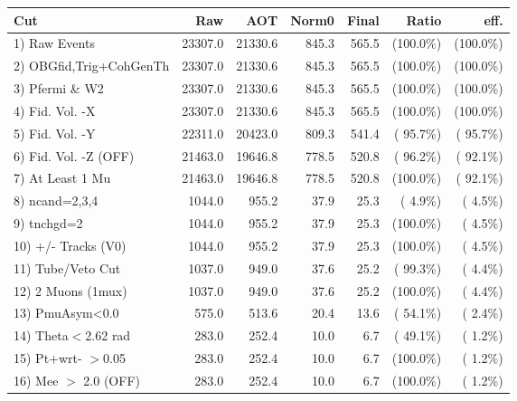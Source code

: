  \begin{table}[h!]\centering
 \begin{tabular}{||l||r|r|r|r|r|r||}
 \hline
 \hline
 Cut & Raw & AOT & Norm0 & Final & Ratio & eff.       \\
 \hline
  1) Raw Events           &      23307.0 &      21330.6 &        845.3 &        565.5 & (100.0\%) & (100.0\%) \\
  2) OBGfid,Trig+CohGenTh &      23307.0 &      21330.6 &        845.3 &        565.5 & (100.0\%) & (100.0\%) \\
  3) Pfermi \& W2         &      23307.0 &      21330.6 &        845.3 &        565.5 & (100.0\%) & (100.0\%) \\
  4) Fid. Vol. -X         &      23307.0 &      21330.6 &        845.3 &        565.5 & (100.0\%) & (100.0\%) \\
  5) Fid. Vol. -Y         &      22311.0 &      20423.0 &        809.3 &        541.4 & ( 95.7\%) & ( 95.7\%) \\
  6) Fid. Vol. -Z (OFF)   &      21463.0 &      19646.8 &        778.5 &        520.8 & ( 96.2\%) & ( 92.1\%) \\
  7) At Least 1 Mu        &      21463.0 &      19646.8 &        778.5 &        520.8 & (100.0\%) & ( 92.1\%) \\
  8) ncand=2,3,4          &       1044.0 &        955.2 &         37.9 &         25.3 & (  4.9\%) & (  4.5\%) \\
  9) tnchgd=2             &       1044.0 &        955.2 &         37.9 &         25.3 & (100.0\%) & (  4.5\%) \\
 10) +/- Tracks (V0)      &       1044.0 &        955.2 &         37.9 &         25.3 & (100.0\%) & (  4.5\%) \\
 11) Tube/Veto Cut        &       1037.0 &        949.0 &         37.6 &         25.2 & ( 99.3\%) & (  4.4\%) \\
 12) 2 Muons (1mux)       &       1037.0 &        949.0 &         37.6 &         25.2 & (100.0\%) & (  4.4\%) \\
 13) PmuAsym<0.0          &        575.0 &        513.6 &         20.4 &         13.6 & ( 54.1\%) & (  2.4\%) \\
 14) Theta$<$2.62 rad     &        283.0 &        252.4 &         10.0 &          6.7 & ( 49.1\%) & (  1.2\%) \\
 15) Pt+wrt- $>$0.05      &        283.0 &        252.4 &         10.0 &          6.7 & (100.0\%) & (  1.2\%) \\
 16) Mee $>$ 2.0  (OFF)   &        283.0 &        252.4 &         10.0 &          6.7 & (100.0\%) & (  1.2\%) \\

\end{tabular}
\end{table}
